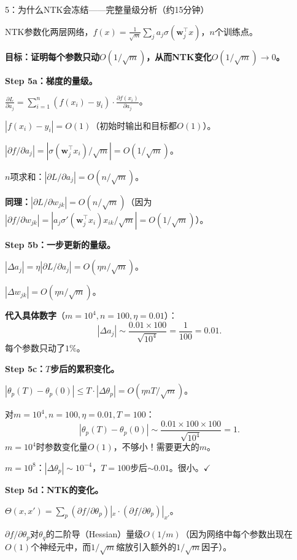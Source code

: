 \documentclass[11pt,a4paper]{article}
\newcommand{\bw}{\mathbf{w}}
\begin{document}
\begin{handcalc}{5：为什么NTK会冻结——完整量级分析（约15分钟）}

NTK参数化两层网络，$f(x)=\frac{1}{\sqrt{m}}\sum_j a_j\sigma(\bw_j^\top x)$，$n$个训练点。

\textbf{目标：证明每个参数只动$O(1/\sqrt{m})$，从而NTK变化$O(1/\sqrt{m})\to 0$。}

\tcblower

\textbf{Step 5a：梯度的量级。}

$\frac{\partial L}{\partial a_j} = \sum_{i=1}^n (f(x_i)-y_i)\cdot\frac{\partial f(x_i)}{\partial a_j}$。

$|f(x_i)-y_i| = O(1)$（初始时输出和目标都$O(1)$）。

$|\partial f/\partial a_j| = |\sigma(\bw_j^\top x_i)/\sqrt{m}| = O(1/\sqrt{m})$。

$n$项求和：$|\partial L/\partial a_j| = O(n/\sqrt{m})$。

\medskip
\textbf{同理：}$|\partial L/\partial w_{jk}| = O(n/\sqrt{m})$（因为$|\partial f/\partial w_{jk}| = |a_j\sigma'(\bw_j^\top x_i)x_{ik}/\sqrt{m}| = O(1/\sqrt{m})$）。

\medskip
\textbf{Step 5b：一步更新的量级。}

$|\Delta a_j| = \eta|\partial L/\partial a_j| = O(\eta n/\sqrt{m})$。

$|\Delta w_{jk}| = O(\eta n/\sqrt{m})$。

\textbf{代入具体数字}（$m=10^4, n=100, \eta=0.01$）：
\[
|\Delta a_j| \sim \frac{0.01\times 100}{\sqrt{10^4}} = \frac{1}{100} = 0.01.
\]
每个参数只动了$1\%$。

\medskip
\textbf{Step 5c：$T$步后的累积变化。}

$|\theta_p(T)-\theta_p(0)| \le T\cdot|\Delta\theta_p| = O(\eta n T/\sqrt{m})$。

对$m=10^4, n=100, \eta=0.01, T=100$：
\[
|\theta_p(T)-\theta_p(0)| \sim \frac{0.01\times 100\times 100}{\sqrt{10^4}} = 1.
\]
$m=10^4$时参数变化量$O(1)$，不够小！需要更大的$m$。

$m=10^8$：$|\Delta\theta_p|\sim 10^{-4}$，$T=100$步后$\sim 0.01$。很小。$\checkmark$

\medskip
\textbf{Step 5d：NTK的变化。}

$\Theta(x,x')=\sum_p (\partial f/\partial\theta_p)|_x\cdot(\partial f/\partial\theta_p)|_{x'}$。

$\partial f/\partial\theta_p$对$\theta_q$的二阶导（Hessian）量级$O(1/m)$（因为网络中每个参数出现在$O(1)$个神经元中，而$1/\sqrt{m}$缩放引入额外的$1/\sqrt{m}$因子）。


\end{handcalc}
\end{document}
